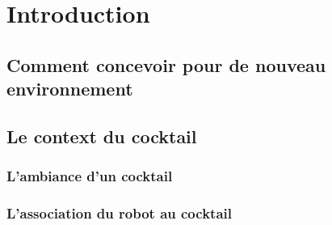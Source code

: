 \chapter*{Introduction}

\section{Comment concevoir pour de nouveau environnement}

\section{Le context du cocktail}

\subsection{L'ambiance d'un cocktail}

\subsection{L'association du robot au cocktail}
